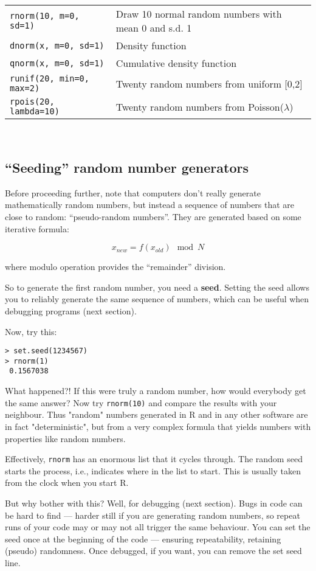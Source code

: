 \begin{tabular}{p{5.4cm} p{9cm}}
	{\tt rnorm(10, m=0, sd=1)} & Draw 10 normal random numbers with mean 0 and s.d. 1\\
	{\tt dnorm(x, m=0, sd=1)} & Density function\\
	{\tt qnorm(x, m=0, sd=1)} & Cumulative density function\\
	{\tt runif(20, min=0, max=2)} & Twenty random numbers from uniform
			[0,2]\\
	{\tt rpois(20, lambda=10)} & Twenty random numbers from
			Poisson($\lambda$)\\
\end{tabular}\\

\subsection{``Seeding'' random number generators}   
Before proceeding further, note that computers don't really generate mathematically random numbers, but 
instead a sequence of numbers that are close to random: ``pseudo-random 
numbers''. They are generated based on some iterative formula:

\[ x_{new} = f( x_{old}) \mod N \]

where modulo operation provides the ``remainder'' division.

So to generate the first random number, you need a {\bf seed}. Setting 
the seed allows you to reliably generate the same sequence of numbers, 
which can be useful when debugging programs (next section). 

Now, try this:

\begin{lstlisting}
> set.seed(1234567)
> rnorm(1)
 0.1567038
\end{lstlisting}

What happened?! If this were truly a random number, how would everybody 
get the same answer? Now try {\tt rnorm(10)} and compare the results 
with your neighbour. Thus "random" numbers generated in R and in any 
other software are in fact "deterministic", but from a very complex 
formula that yields numbers with properties like random numbers. 

Effectively, {\tt rnorm} has an enormous list that it cycles through. 
The random seed starts the process, i.e., indicates where in the list 
to start. This is usually taken from the clock when you start R.

But why bother with this? Well, for debugging (next section). Bugs in 
code can be hard to find --- harder still if you are generating random 
numbers, so repeat runs of your code may or may not all trigger the 
same behaviour. You can set the seed once at the beginning of the code 
--- ensuring repeatability, retaining (pseudo) randomness. Once 
debugged, if you want, you can remove the set seed line.

